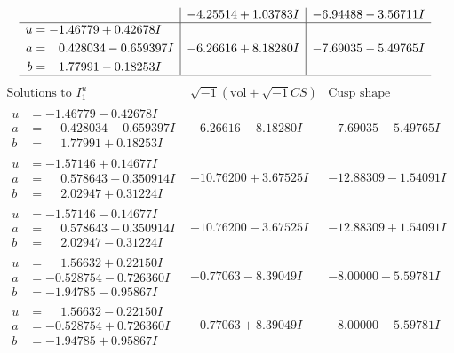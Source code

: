 \documentclass[1p]{elsarticle_modified}
\theoremstyle{definition}
\newcommand{\I}{\sqrt{-1}}
\begin{document}
$$\begin{array}{c|c|c}
 & -4.25514 + 1.03783 I & -6.94488 - 3.56711 I \\ \hline\begin{aligned}
u &= -1.46779 + 0.42678 I \\
a &= \phantom{-}0.428034 - 0.659397 I \\
b &= \phantom{-}1.77991 - 0.18253 I\end{aligned}
 & -6.26616 + 8.18280 I & -7.69035 - 5.49765 I\\
 \hline 
 \end{array}$$\newpage$$\begin{array}{c|c|c}  
\text{Solutions to }I^u_{1}& \I (\text{vol} + \sqrt{-1}CS) & \text{Cusp shape}\\
 \hline 
\begin{aligned}
u &= -1.46779 - 0.42678 I \\
a &= \phantom{-}0.428034 + 0.659397 I \\
b &= \phantom{-}1.77991 + 0.18253 I\end{aligned}
 & -6.26616 - 8.18280 I & -7.69035 + 5.49765 I \\ \hline\begin{aligned}
u &= -1.57146 + 0.14677 I \\
a &= \phantom{-}0.578643 + 0.350914 I \\
b &= \phantom{-}2.02947 + 0.31224 I\end{aligned}
 & -10.76200 + 3.67525 I & -12.88309 - 1.54091 I \\ \hline\begin{aligned}
u &= -1.57146 - 0.14677 I \\
a &= \phantom{-}0.578643 - 0.350914 I \\
b &= \phantom{-}2.02947 - 0.31224 I\end{aligned}
 & -10.76200 - 3.67525 I & -12.88309 + 1.54091 I \\ \hline\begin{aligned}
u &= \phantom{-}1.56632 + 0.22150 I \\
a &= -0.528754 - 0.726360 I \\
b &= -1.94785 - 0.95867 I\end{aligned}
 & -0.77063 - 8.39049 I & -8.00000 + 5.59781 I \\ \hline\begin{aligned}
u &= \phantom{-}1.56632 - 0.22150 I \\
a &= -0.528754 + 0.726360 I \\
b &= -1.94785 + 0.95867 I\end{aligned}
 & -0.77063 + 8.39049 I & -8.00000 - 5.59781 I \\ \hline\begin{aligned}

\end{aligned}
\end{array}$$
\end{document}
